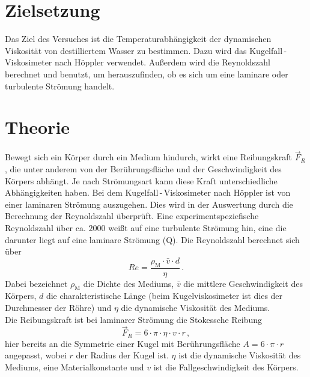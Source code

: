 \section{Zielsetzung}
\label{sec:Zielsetzung}
Das Ziel des Versuches ist die Temperaturabhängigkeit der dynamischen 
Viskosität von destilliertem Wasser zu bestimmen. Dazu wird das 
Kugelfall\,-\,Viskosimeter nach Höppler verwendet. Außerdem wird die Reynoldszahl 
berechnet und benutzt, um herauszufinden, ob es sich um eine laminare oder
turbulente Strömung handelt.
%
%
%
\section{Theorie}
    \label{sec:Theorie}
    Bewegt sich ein Körper durch ein Medium hindurch, wirkt eine Reibungskraft 
    $\vec{F}_{R}$, die unter anderem von der Berührungsfläche und der Geschwindigkeit
    des Körpers abhängt. Je nach Strömungsart kann diese Kraft 
    unterschiedliche Abhängigkeiten haben. Bei dem Kugelfall\,-\,Viskosimeter nach 
    Höppler ist von einer laminaren Strömung auszugehen. 
    Dies wird in der Auswertung durch die
    Berechnung der Reynoldszahl überprüft. Eine experimentspeziefische 
    Reynoldszahl über ca. $2000$ weißt auf eine turbulente Strömung hin, eine die
    darunter liegt auf eine laminare Strömung (Q\cite{reynoldzahllaminareStrömungen}). Die Reynoldszahl berechnet sich
    über 
    \begin{equation}
        Re = \frac{\rho_{\text{M}} \cdot \bar{v} \cdot d}{\eta}\,. 
        \label{eqn:Reynoldszahl}
    \end{equation}
    Dabei bezeichnet $\rho_{\text{M}}$ die Dichte des Mediums, $\bar{v}$
    die mittlere Geschwindigkeit des Körpers, $d$ die charakteristische 
    Länge (beim Kugelviskosimeter ist dies der Durchmesser der Röhre)
    und $\eta$ die dynamische Viskosität des Mediums. \\
    Die Reibungskraft ist bei laminarer Strömung die Stokessche Reibung
    \begin{equation}
        \vec{F}_{R} = 6 \cdot \pi \cdot \eta \cdot v \cdot r \, , 
        \label{eqn:Stokesreibungskraft}
    \end{equation}
    hier bereits an die Symmetrie einer Kugel mit Berührungsfläche 
    $A = 6 \cdot \pi \cdot r$ angepasst, wobei $r$ der Radius der Kugel ist. 
    $\eta$ ist die dynamische Viskosität des Mediums, eine Materialkonstante und
    $v$ ist die Fallgeschwindigkeit des Körpers. \\
%
%
%
